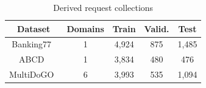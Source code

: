 \begin{table}[!htb]
\caption{Derived request collections}
\label{tab:derived-request-collections}
\centering\footnotesize
\setlength{\tabcolsep}{2.5pt}
\renewcommand{\arraystretch}{1.08}
\begin{tabular*}{\columnwidth}{@{\extracolsep{\fill}}ccccc@{}}
\toprule
Dataset & Domains & Train & Valid. & Test \\
\midrule
Banking77~\cite{casanueva2020banking77} & 1 & 4,924 & 875 & 1,485 \\
ABCD~\cite{chen2021abcd} & 1 & 3,834 & 480 & 476 \\
MultiDoGO~\cite{peskov2019multidogo} & 6 & 3,993 & 535 & 1,094 \\
\bottomrule
\end{tabular*}
\end{table}
